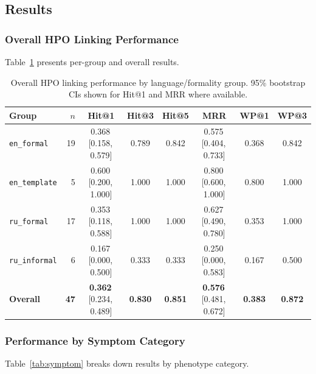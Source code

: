 \documentclass[11pt,a4paper]{article}
\begin{document}
\subsection{Results}

\subsubsection*{Overall HPO Linking Performance}

Table~\ref{tab:overall} presents per-group and overall results.

\begin{table}[H]
\centering
\caption{Overall HPO linking performance by language/formality group.
95\% bootstrap CIs shown for Hit@1 and MRR where available.}
\label{tab:overall}
\setlength{\tabcolsep}{5pt}
\begin{tabular}{lrcccccc}
\toprule
\textbf{Group} & $n$ & \textbf{Hit@1} & \textbf{Hit@3} & \textbf{Hit@5}
               & \textbf{MRR} & \textbf{WP@1} & \textbf{WP@3} \\
\midrule
\texttt{en\_formal}
  & 19 & 0.368\,{\scriptsize[0.158,\,0.579]}
       & 0.789 & 0.842
       & 0.575\,{\scriptsize[0.404,\,0.733]}
       & 0.368 & 0.842 \\
\texttt{en\_template}
  &  5 & 0.600\,{\scriptsize[0.200,\,1.000]}
       & 1.000 & 1.000
       & 0.800\,{\scriptsize[0.600,\,1.000]}
       & 0.800 & 1.000 \\
\texttt{ru\_formal}
  & 17 & 0.353\,{\scriptsize[0.118,\,0.588]}
       & 1.000 & 1.000
       & 0.627\,{\scriptsize[0.490,\,0.780]}
       & 0.353 & 1.000 \\
\texttt{ru\_informal}
  &  6 & 0.167\,{\scriptsize[0.000,\,0.500]}
       & 0.333 & 0.333
       & 0.250\,{\scriptsize[0.000,\,0.583]}
       & 0.167 & 0.500 \\
\midrule
\textbf{Overall}
  & \textbf{47}
       & \textbf{0.362}\,{\scriptsize[0.234,\,0.489]}
       & \textbf{0.830} & \textbf{0.851}
       & \textbf{0.576}\,{\scriptsize[0.481,\,0.672]}
       & \textbf{0.383} & \textbf{0.872} \\
\bottomrule
\end{tabular}
\end{table}

\subsubsection*{Performance by Symptom Category}

Table~\ref{tab:symptom} breaks down results by phenotype category.
\end{document}

